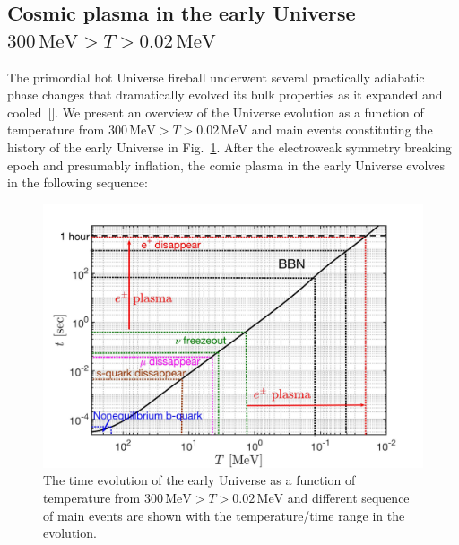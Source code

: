 \subsection{Cosmic plasma in the early Universe $300\,\mathrm{MeV}>T>0.02\,\mathrm{MeV}$}

The primordial hot Universe fireball underwent several practically adiabatic phase changes that dramatically evolved its bulk properties as it expanded and cooled~[\cite{Rafelski:2023emw}]. We present an overview of the Universe evolution as a function of temperature from $300\,\mathrm{MeV}>T>0.02\,\mathrm{MeV}$ and main events constituting the history of the early Universe in Fig.~\ref{Overview_fig}. After the electroweak symmetry breaking epoch and presumably inflation, the comic plasma in the early Universe evolves in the following sequence:

\begin{figure}[ht]
 \centerline{\includegraphics[width=\textwidth,width=\linewidth]{./plots/CosmicTimeTemperature_Project}}
 \caption{The time evolution of the early Universe as a function of temperature from $300\,\mathrm{MeV}>T>0.02\,\mathrm{MeV}$ and 
 different sequence of main events are shown with the temperature/time range in the evolution. }
 \label{Overview_fig}
\end{figure}

